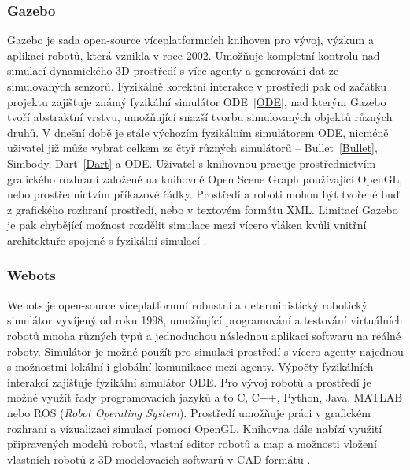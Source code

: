 \subsubsection{Gazebo} \label{Gazebo}
Gazebo \citep{gazeborobotics} je sada open-source víceplatformních knihoven pro
vývoj, výzkum a aplikaci robotů, která vznikla v roce 2002. Umožňuje kompletní
kontrolu nad simulací dynamického 3D prostředí s více agenty a generování dat
ze simulovaných senzorů. Fyzikálně korektní interakce v prostředí pak od
začátku projektu zajišťuje známý fyzikální simulátor ODE~\ref{ODE}, nad kterým
Gazebo tvoří abstraktní vrstvu, umožňující snazší tvorbu simulovaných objektů
různých druhů. V dnešní době je stále výchozím fyzikálním simulátorem ODE,
nicméně uživatel již může vybrat celkem ze čtyř různých simulátorů --
Bullet~\ref{Bullet}, Simbody, Dart~\ref{Dart} a ODE. Uživatel s knihovnou
pracuje prostřednictvím grafického rozhraní založené na knihovně Open Scene
Graph používající OpenGL, nebo prostřednictvím příkazové řádky. Prostředí a
roboti mohou být tvořené buď z grafického rozhraní prostředí, nebo v textovém
formátu XML. Limitací Gazebo je pak chybějící možnost rozdělit simulace mezi
vícero vláken kvůli vnitřní architektuře spojené s fyzikální simulací
\citep{koenig2004design}. 

\subsubsection{Webots} \label{Webots}
Webots \citep{Webots} je open-source víceplatformní robustní a deterministický
robotický simulátor vyvíjený od roku 1998, umožňující programování a testování
virtuálních robotů mnoha různých typů a jednoduchou následnou aplikaci softwaru
na reálné roboty. Simulátor je možné použít pro simulaci prostředí s vícero
agenty najednou s možnostmi lokální i globální komunikace mezi agenty. Výpočty
fyzikálních interakcí zajišťuje fyzikální simulátor ODE. Pro vývoj robotů a
prostředí je možné využít řady programovacích jazyků a to C, C++, Python, Java,
MATLAB nebo ROS (\emph{Robot Operating System}). Prostředí umožňuje práci v
grafickém rozhraní a vizualizaci simulací pomocí OpenGL. Knihovna dále nabízí
využití připravených modelů robotů, vlastní editor robotů a map a možnosti
vložení vlastních robotů z 3D modelovacích softwarů v CAD formátu
\citep{michel2004cyberbotics}.

